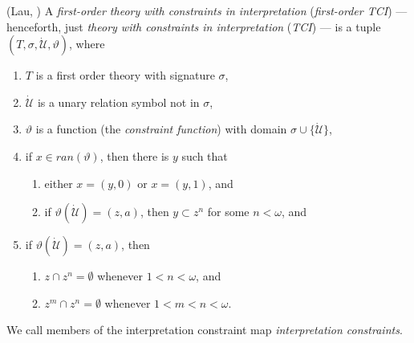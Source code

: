 \documentclass[12pt]{article}
\numberwithin{equation}{section}
\begin{document}
\begin{defi}(Lau, \cite{myself})
A \emph{first-order theory with constraints in interpretation} (\emph{first-order TCI}) --- henceforth, just \emph{theory with constraints in interpretation} (\emph{TCI}) --- is a tuple $(T, \sigma, \dot{\mathcal{U}}, \vartheta)$, where
\begin{enumerate}[label=(\alph*)]
    \item $T$ is a first order theory with signature $\sigma$,
    \item $\dot{\mathcal{U}}$ is a unary relation symbol not in $\sigma$,
    \item $\vartheta$ is a function (the \emph{constraint function}) with domain $\sigma \cup \{\dot{\mathcal{U}}\}$, 
    \item if $x \in ran(\vartheta)$, then there is $y$ such that 
    \begin{enumerate}[label=(\roman*)]
        \item either $x = (y, 0)$ or $x = (y, 1)$, and
        \item if $\vartheta(\dot{\mathcal{U}}) = (z, a)$, then $y \subset z^n$ for some $n < \omega$, and
    \end{enumerate}
    \item if $\vartheta(\dot{\mathcal{U}}) = (z, a)$, then 
    \begin{enumerate}[label=(\roman*)]
        \item $z \cap z^n = \emptyset$ whenever $1 < n < \omega$, and
        \item $z^m \cap z^n = \emptyset$ whenever $1 < m < n < \omega$.
    \end{enumerate}
\end{enumerate}
We call members of the interpretation constraint map \emph{interpretation constraints}.
\end{defi}
\end{document}
